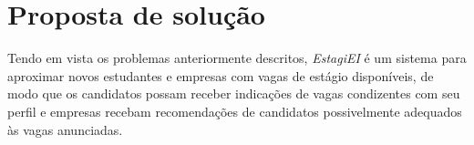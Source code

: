 \section{Proposta de solução}
Tendo em vista os problemas anteriormente descritos, \emph{EstagiEI} é um sistema para aproximar novos estudantes e empresas com vagas de estágio disponíveis, de modo que os candidatos possam receber indicações de vagas condizentes com seu perfil e empresas recebam recomendações de candidatos possivelmente adequados às vagas anunciadas.
